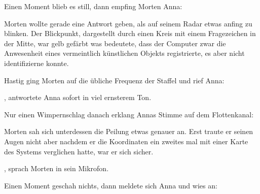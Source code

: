 \par

Einen Moment blieb es still, dann empfing Morten Anna: 

\par

Morten wollte gerade eine Antwort geben, als auf seinem Radar etwas anfing zu blinken. Der Blickpunkt, dargestellt durch einen Kreis mit einem Fragezeichen in der Mitte, war gelb gefärbt was bedeutete, dass der Computer zwar die Anwesenheit eines vermeintlich künstlichen Objekts registrierte, es aber nicht identifizierne konnte.

\par

Hastig ging Morten auf die übliche Frequenz der Staffel und rief Anna: 

\par

, antwortete Anna sofort in viel ernsterem Ton. 

\par

Nur einen Wimpernschlag danach erklang Annas Stimme auf dem Flottenkanal: 

\par

Morten sah sich unterdessen die Peilung etwas genauer an. Erst traute er seinen Augen nicht aber nachdem er die Koordinaten ein zweites mal mit einer Karte des Systems verglichen hatte, war er sich sicher.

\par

, sprach Morten in sein Mikrofon. 

\par

Einen Moment geschah nichts, dann meldete sich Anna und wies an: 

